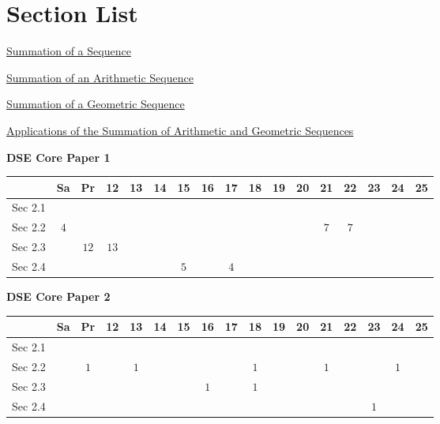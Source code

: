 \documentclass[12pt, a4paper]{article}
\begin{document}
\section*{Section List}
\begin{enumx}[label=Sec 2.\arabic*\ ]
\item \hyperref[section:6-2-1]{Summation of a Sequence \NF}
\item \hyperref[section:6-2-2]{Summation of an Arithmetic Sequence \NF}
\item \hyperref[section:6-2-3]{Summation of a Geometric Sequence \NF}
\item \hyperref[section:6-2-4]{Applications of the Summation of Arithmetic and Geometric Sequences \NF}
\end{enumx}
\begin{absolutelynopagebreak}
\begin{center}
\textbf{DSE Core Paper 1}
\end{center}
\begin{center}
\begin{tabular}{|l|c|c|c|c|c|c|c|c|c|c|c|c|c|c|c|c|}
\hline
        & Sa & Pr & 12 & 13 & 14 & 15 & 16 & 17 & 18 & 19 & 20 & 21 & 22 & 23 & 24 & 25 \\\hline\hline
Sec 2.1 &  &  &  &  &  &  &  &  &  &  &  &  &  &  &  &  \\\hline
Sec 2.2 &  $4$ &  &  &  &  &  &  &  &  &  &  &  $7$ &  $7$ &  &  &  \\\hline
Sec 2.3 &  &  $12$ &  $13$ &  &  &  &  &  &  &  &  &  &  &  &  &  \\\hline
Sec 2.4 &  &  &  &  &  &  $5$ &  &  $4$ &  &  &  &  &  &  &  &  \\\hline
\end{tabular}
\end{center}
\end{absolutelynopagebreak}
\begin{absolutelynopagebreak}
\begin{center}
\textbf{DSE Core Paper 2}
\end{center}
\begin{center}
\begin{tabular}{|l|c|c|c|c|c|c|c|c|c|c|c|c|c|c|c|c|}
\hline
        & Sa & Pr & 12 & 13 & 14 & 15 & 16 & 17 & 18 & 19 & 20 & 21 & 22 & 23 & 24 & 25 \\\hline\hline
Sec 2.1 &  &  &  &  &  &  &  &  &  &  &  &  &  &  &  &  \\\hline
Sec 2.2 &  &  $1$ &  &  $1$ &  &  &  &  &  $1$ &  &  &  $1$ &  &  &  $1$ &  \\\hline
Sec 2.3 &  &  &  &  &  &  &  $1$ &  &  $1$ &  &  &  &  &  &  &  \\\hline
Sec 2.4 &  &  &  &  &  &  &  &  &  &  &  &  &  &  $1$ &  &  \\\hline
\end{tabular}
\end{center}
\end{absolutelynopagebreak}
\end{document}

